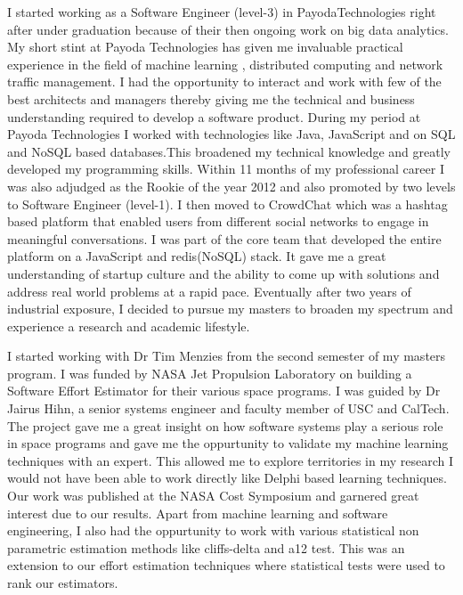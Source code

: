 \documentclass{article}
\begin{document}
I started working as a Software Engineer (level-3) in PayodaTechnologies right after under 
graduation because of their then ongoing work on big data analytics. My short stint at Payoda
Technologies has given me invaluable practical experience in the field of machine learning , 
distributed computing and network traffic management. I had the opportunity to interact and 
work with few of the best architects and managers thereby giving me the technical and business
understanding required to develop a software product. During my period at Payoda Technologies
I worked with technologies like Java, JavaScript and on SQL and NoSQL based 
databases.This broadened my technical knowledge and greatly developed my programming 
skills. Within 11 months of my professional career I was also adjudged as the Rookie 
of the year 2012 and also promoted by two levels to Software Engineer (level-1). I then moved 
to CrowdChat which was a hashtag based platform that enabled users from different social 
networks to engage in meaningful conversations. I was part of the  core team that developed 
the entire platform on a JavaScript and redis(NoSQL) stack. It gave me a great understanding  of startup
culture and the ability to come up with solutions and address real world problems at a rapid pace. Eventually
after two years of industrial exposure, I decided to pursue my masters to broaden my spectrum
and experience a research and academic lifestyle.


\bigskip
I started working with Dr Tim Menzies from the second semester of my masters program. I was funded by NASA Jet Propulsion Laboratory on building a Software Effort Estimator for their various space programs. I was guided by Dr Jairus Hihn, a senior systems engineer and faculty member of USC and CalTech. The project gave me a great insight on how software systems play a serious role in space programs and gave me the oppurtunity to validate my machine learning techniques with an expert. This allowed me to explore territories in my research I would not have been able to work directly like Delphi based learning techniques. Our work was published at the NASA Cost Symposium and garnered great interest due to our results. Apart from machine learning and software engineering, I also had the oppurtunity to work with various statistical non parametric estimation methods like cliffs-delta and a12 test. This was an extension to our effort estimation techniques where statistical tests were used to rank our estimators.
\end{document}
